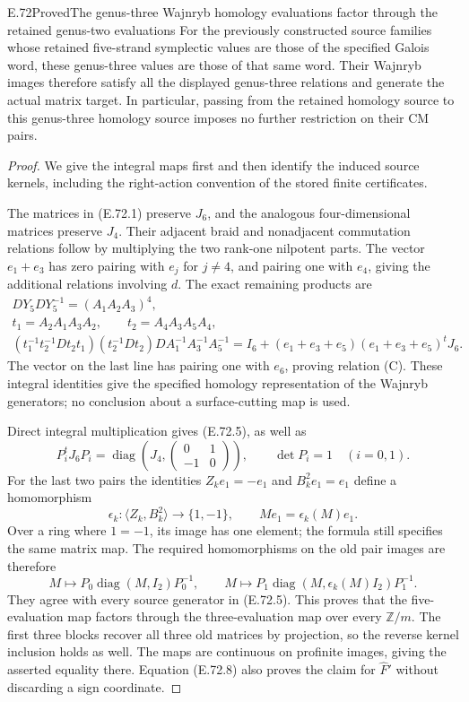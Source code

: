 \begin{statement}{E.72}{Proved}{The genus-three Wajnryb homology evaluations factor through the retained genus-two evaluations}
For the previously constructed source families whose retained
five-strand symplectic values are those of the specified Galois
word, these genus-three values are those of that same word.
Their Wajnryb images therefore satisfy all the displayed genus-three
relations and generate the actual matrix target.  In particular,
passing from the retained homology source to this genus-three
homology source imposes no further restriction on their CM pairs.
\end{statement}
\begin{proof}
We give the integral maps first and then identify the induced source
kernels, including the right-action convention of the stored finite
certificates.

The matrices in (E.72.1) preserve $J_6$, and the analogous four-dimensional
matrices preserve $J_4$.  Their adjacent braid and nonadjacent
commutation relations follow by multiplying the two rank-one
nilpotent parts.  The vector $e_1+e_3$ has zero pairing with $e_j$
for $j\ne4$, and pairing one with $e_4$, giving the additional
relations involving $d$.  The exact remaining products are
\[
 \begin{gathered}
 D Y_5 D Y_5^{-1}=(A_1A_2A_3)^4,\\
 t_1=A_2A_1A_3A_2,\qquad t_2=A_4A_3A_5A_4,\\
 (t_1^{-1}t_2^{-1}Dt_2t_1)(t_2^{-1}Dt_2)
       D A_1^{-1}A_3^{-1}A_5^{-1}
   =I_6+(e_1+e_3+e_5)(e_1+e_3+e_5)^tJ_6.
 \end{gathered}
 \tag{E.72.6}
\]
The vector on the last line has pairing one with $e_6$, proving
relation (C).  These integral identities give the specified
homology representation of the Wajnryb generators; no conclusion
about a surface-cutting map is used.

Direct integral multiplication gives (E.72.5), as well as
\[
 P_i^tJ_6P_i=\operatorname{diag}
       \left(J_4,\begin{pmatrix}0&1\\-1&0\end{pmatrix}\right),
 \qquad \det P_i=1\quad(i=0,1).
 \tag{E.72.7}
\]
For the last two pairs the identities $Z_ke_1=-e_1$ and
$B_k^2e_1=e_1$ define a homomorphism
\[
 \epsilon_k:\langle Z_k,B_k^2\rangle\longrightarrow
       \{1,-1\},\qquad M e_1=\epsilon_k(M)e_1.
 \tag{E.72.8}
\]
Over a ring where $1=-1$, its image has one element; the formula
still specifies the same matrix map.  The required homomorphisms
on the old pair images are therefore
\[
 M\longmapsto P_0\operatorname{diag}(M,I_2)P_0^{-1},
 \qquad
 M\longmapsto P_1\operatorname{diag}
                (M,\epsilon_k(M)I_2)P_1^{-1}.
 \tag{E.72.9}
\]
They agree with every source generator in (E.72.5).  This proves
that the five-evaluation map factors through the three-evaluation
map over every $\mathbb Z/m$.  The first three blocks recover all
three old matrices by projection, so the reverse kernel inclusion
holds as well.  The maps are continuous on profinite images, giving
the asserted equality there.  Equation (E.72.8) also proves the
claim for $\widehat F'$ without discarding a sign coordinate.


\end{proof}
